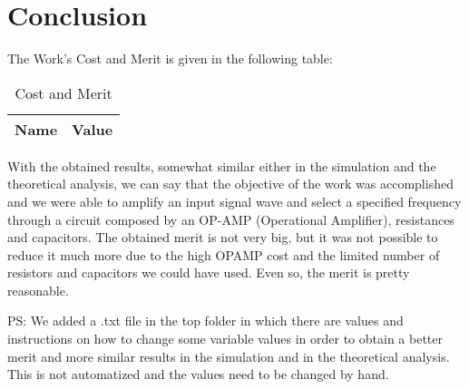 \section{Conclusion}
\label{sec:conclusion}

The Work's Cost and Merit is given in the following table:

\begin{table}[H]
\centering
\begin{tabular}{|l|l|}
\hline
{\bf Name} & {\bf Value} \\ \hline
    
\end{tabular}
\caption{Cost and Merit}
\end{table}

With the obtained results, somewhat similar either in the simulation and the theoretical analysis, we can say that the objective of the work was accomplished and we were able to amplify an input signal wave and select a specified frequency through a circuit composed by an OP-AMP (Operational Amplifier), resistances and capacitors. The obtained merit is not very big, but it was not possible to reduce it much more due to the high OPAMP cost and the limited number of resistors and capacitors we could have used. Even so, the merit is pretty reasonable.

PS: We added a .txt file in the top folder in which there are values and instructions on how to change some variable values in order to obtain a better merit and more similar results in the simulation and in the theoretical analysis. This is not automatized and the values need to be changed by hand.